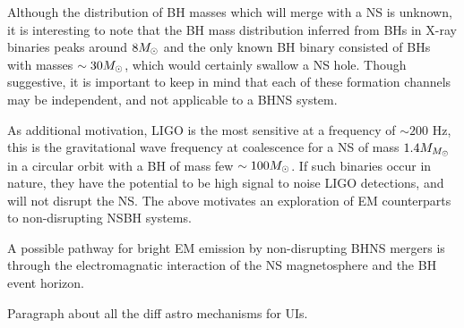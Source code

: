Although the distribution of BH masses which will merge with
a NS is unknown, it is interesting to note that the BH mass distribution
inferred from BHs in X-ray binaries peaks around $8 {M_{\odot}}$ \citep{Ozel:2010}
and the only known BH binary consisted of BHs with masses $\sim 30 {M_{\odot}}$, which
would certainly swallow a NS hole. Though suggestive, it is important to keep
in mind that each of these formation channels may be independent, and not
applicable to a BHNS system.

As additional motivation, LIGO is the most sensitive at a frequency of $\sim
200$ Hz, this is the gravitational wave frequency at coalescence for a NS of
mass $1.4 M_{{M_{\odot}}}$ in a circular orbit with a BH of mass few $\sim100
{M_{\odot}}$. If such binaries occur in nature, they have the potential to be high
signal to noise LIGO detections, and will not disrupt the NS. The
above motivates an exploration of EM counterparts to non-disrupting NSBH
systems.


A possible pathway for bright EM emission by non-disrupting BHNS mergers is
through the electromagnatic interaction of the NS magnetosphere and the BH
event horizon. 

Paragraph about all the diff astro mechanisms for UIs.

